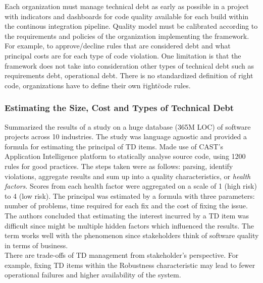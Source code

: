 \documentclass{mprop}
\begin{document}
Each organization must manage technical debt as early as possible in a project
with indicators and dashboards for code quality available for each build within
the continous integration pipeline. Quality model must be calibrated according
to the requirements and policies of the organization implementing the framework.
For example, to approve/decline rules that are considered debt and what
principal costs are for each type of code violation. One limitation is that the
framework does not take into consideration other types of technical debt such as
requirements debt, operational debt. There is no standardized definition of
right code, organizations have to define their own \"right\" code rules.

\subsubsection{Estimating the Size, Cost and Types of Technical Debt}
\cite{Curtis2012} Summarized the results of a study on a huge database (365M
LOC) of software projects across 10 industries. The study was language agnostic
and provided a formula for estimating the principal of TD items. Made use of
CAST's Application Intelligence platform to statically analyse source code,
using 1200 rules for good practices. The steps taken were as follows: parsing,
identify violations, aggregate results and sum up into a quality
characteristics, or \textit{health factors}. Scores from each health factor were
aggregated on a scale of 1 (high risk) to 4 (low risk). The principal was
estimated by a formula with three parameters: number of problems, time required
for each fix and the cost of fixing the issue. The authors concluded that
estimating the interest incurred by a TD item was difficult since might be
multiple hidden factors which influenced the results. The term works well with
the phenomenon since stakeholders think of software quality in terms of
business. \\
There are trade-offs of TD management from stakeholder's perspective. For
example, fixing TD items within the Robustness characteristic may lead to fewer
operational failures and higher availability of the system.
\end{document}
